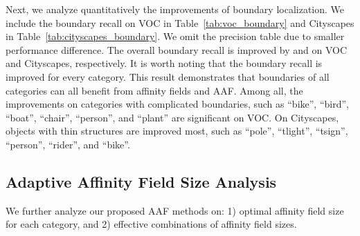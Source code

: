 \begin{table*}[b!]
  \centering
    \vspace{0.5pt}
    \caption{Per-class boundary recall results on Cityscapes validation set.}
    \label{tab:cityscapes_boundary}
\end{table*}

Next, we analyze quantitatively the improvements of boundary localization. We include the boundary recall on VOC in Table~\ref{tab:voc_boundary} and Cityscapes in Table~\ref{tab:cityscapes_boundary}. We omit the precision table due to smaller performance difference. The overall boundary recall is improved by  and  on VOC and Cityscapes, respectively. It is worth noting that the boundary recall is improved for every category. This result demonstrates that boundaries of all categories can all benefit from affinity fields and AAF. Among all, the improvements on categories with complicated boundaries, such as ``bike'', ``bird'', ``boat'', ``chair'',  ``person'', and ``plant'' are significant on VOC. On Cityscapes, objects with thin structures are improved most, such as ``pole'', ``tlight'', ``tsign'', ``person'', ``rider'', and ``bike''.

\subsection{Adaptive Affinity Field Size Analysis}
\label{sec:aaf_analysis}
We further analyze our proposed AAF methods on: 1) optimal affinity field size for each category, and 2) effective combinations of affinity field sizes.

